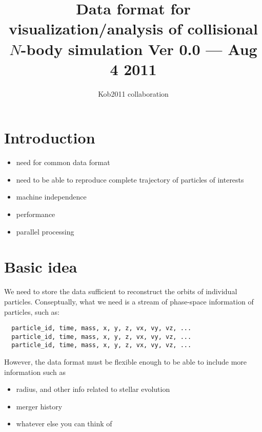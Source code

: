 \documentclass[12pt]{article}
\begin{document}
\def\bx{{\bf x}}
\def\bv{{\bf v}}
\def\ba{{\bf a}}
\def\badot{{\bf \dot{a}}}
\def\batwodot{{\bf a}^{(2)}}
\def\bathreedot{{\bf a}^{(3)}}
\def\bj{{\bf j}}
\def\dt{{\Delta t}}
\def\comment#1{}
\def\sub#1{_{\rm #1}}
\def\sup#1{^{\rm #1}}
\def\APJ{{\it Ap. J. }}
\def\APJL{{\it Ap. J. Lett. }}


\title{Data format for visualization/analysis of collisional $N$-body simulation
{\large 
Ver 0.0 --- Aug 4 2011
}
}
\author{Kob2011 collaboration}
\maketitle

\tableofcontents

\newpage

\thispagestyle{empty}




\section{Introduction}

\begin{itemize}

  \item need for common data format
  \item need to be able to reproduce complete trajectory of particles
    of interests
  \item machine independence
  \item performance
  \item parallel processing
\end{itemize}

\section{Basic idea}

We need to store the data sufficient to reconstruct the orbits of
individual particles. Conseptually, what we need is a stream of
phase-space information of particles, such as:
\begin{verbatim}
  particle_id, time, mass, x, y, z, vx, vy, vz, ...
  particle_id, time, mass, x, y, z, vx, vy, vz, ...
  particle_id, time, mass, x, y, z, vx, vy, vz, ...
\end{verbatim}
However, the data format must be flexible enough to be able to include
more information such as
\begin{itemize}
  \item radius, and other info related to stellar evolution
  \item merger history
  \item whatever else you can think of
\end{itemize}
\end{document}
